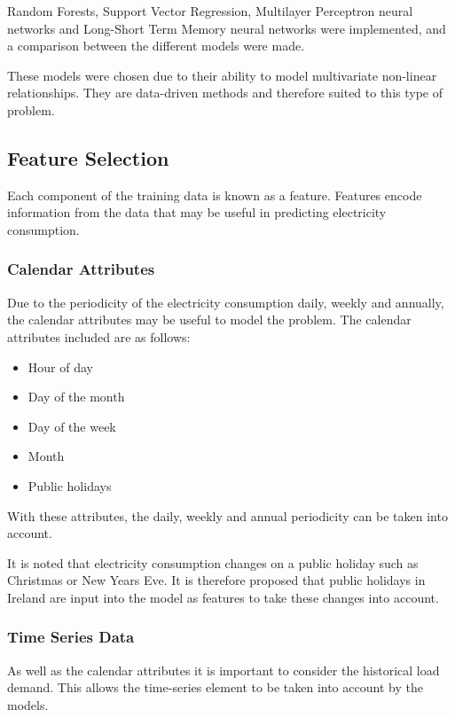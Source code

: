 Random Forests, Support Vector Regression, Multilayer Perceptron neural networks and Long-Short Term Memory neural networks were implemented, and a comparison between the different models were made. 

These models were chosen due to their ability to model multivariate non-linear relationships. They are data-driven methods and therefore suited to this type of problem.

\subsection{Feature Selection}

Each component of the training data is known as a feature. Features encode information from the data that may be useful in predicting electricity consumption. 

\subsubsection{Calendar Attributes}

Due to the periodicity of the electricity consumption daily, weekly and annually, the calendar attributes may be useful to model the problem. The calendar attributes included are as follows:

\begin{itemize}
	\item Hour of day
	\item Day of the month
	\item Day of the week
	\item Month
	\item Public holidays
\end{itemize}

With these attributes, the daily, weekly and annual periodicity can be taken into account.

It is noted that electricity consumption changes on a public holiday such as Christmas or New Years Eve. It is therefore proposed that public holidays in Ireland are input into the model as features to take these changes into account. 

\subsubsection{Time Series Data}

As well as the calendar attributes it is important to consider the historical load demand. This allows the time-series element to be taken into account by the models. 


